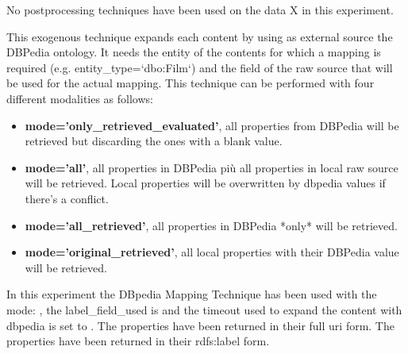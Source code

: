 \documentclass[11pt]{article}
\begin{document}
No postprocessing techniques have been used on the data X in this experiment.
\hfill\break
\hfill\break
{}



This exogenous technique expands each content by using as external source the DBPedia ontology.
It needs the entity of the contents for which a mapping is required (e.g. entity\_type=`dbo:Film`)
and the field of the raw source that will be used for the actual mapping.
This technique can be performed with four different modalities as follows:
\begin{itemize}
 \item
       \textbf{mode='only\_retrieved\_evaluated'}, all properties from DBPedia will be retrieved but discarding the
        ones with a blank value.
 \item
       \textbf{mode='all'}, all properties in DBPedia più all properties in local raw source will be retrieved.
        Local properties will be overwritten by dbpedia values if there's a conflict.
 \item
       \textbf{mode='all\_retrieved'}, all properties in DBPedia *only* will be retrieved.
 \item
       \textbf{mode='original\_retrieved'}, all local properties with their DBPedia value will be retrieved.
\end{itemize}
\hfill\break
\hfill\break
In this experiment the DBpedia Mapping Technique has been used with the mode:
, the label_field_used is
 and the timeout used
to expand the content with dbpedia is set to
.
The properties have been returned in their full uri form.
The properties have been returned in their rdfs:label form.
\hfill\break
\hfill\break
{}
\end{document}
